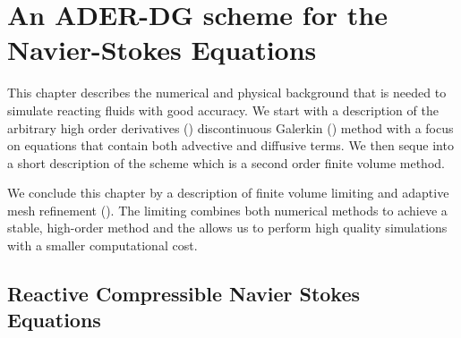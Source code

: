 \chapter{An ADER-DG scheme for the Navier-Stokes Equations}\label{chap:methods}
This chapter describes the numerical and physical background that is needed to simulate reacting fluids with good accuracy.
We start with a description of the arbitrary high order derivatives (\ader{}) discontinuous Galerkin (\dg{}) method with a focus on equations that contain both advective and diffusive terms.
We then seque into a short description of the \muscl{} scheme which is a second order finite volume method.

We conclude this chapter by a description of finite volume limiting and adaptive mesh refinement (\amr{}).
The limiting combines both numerical methods to achieve a stable, high-order method and the \amr{} allows us to perform high quality simulations with a smaller computational cost.
\section{Reactive Compressible Navier Stokes Equations}\label{sec:navier-stokes}
\newcommand{\diffCoeff}{\varepsilon}
\newcommand{\hyperFluxDef}{
  \begin{pmatrix}
    \Qj \\
    \Qv  \otimes \Qj + \bm{I} \pressure  \\
    \Qv \cdot (\bm{I} \QE + \bm{I} \pressure) \\
    \Qj \QZZ
  \end{pmatrix}
}
\newcommand{\viscFluxDef}{
  \begin{pmatrix}
    0\\
     \stressT (\Q, \gradQ)  \\
     \Qv \cdot \stressT (\Q, \gradQ) - \kappa \gradient{T}\\
     0\\
   \end{pmatrix}
}

